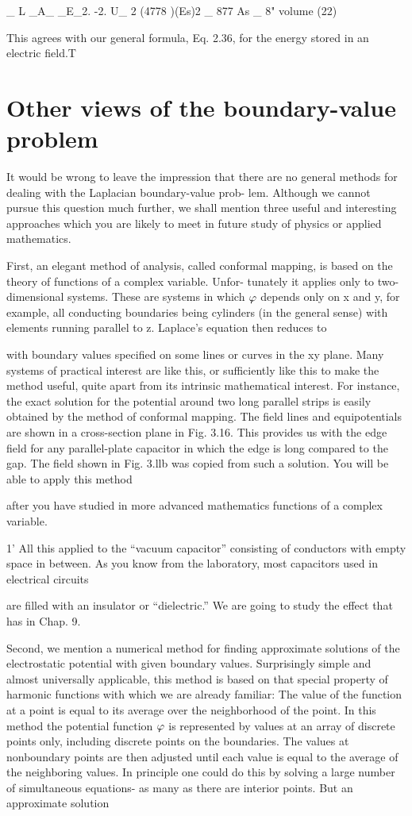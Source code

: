 _ L _A_ _E_2. -2.
U_ 2 (4778 )(Es)2 _ 877 As _ 8" volume (22)

This agrees with our general formula, Eq. 2.36, for the energy stored
in an electric field.T

\section{Other views of the boundary-value problem}

It would be wrong to leave the impression that there are no general
methods for dealing with the Laplacian boundary-value prob-
lem. Although we cannot pursue this question much further, we
shall mention three useful and interesting approaches which you are
likely to meet in future study of physics or applied mathematics.

First, an elegant method of analysis, called conformal mapping,
is based on the theory of functions of a complex variable. Unfor-
tunately it applies only to two-dimensional systems. These are systems
in which $\varphi$ depends only on x and y, for example, all conducting
boundaries being cylinders (in the general sense) with elements
running parallel to z. Laplace's equation then reduces to

with boundary values specified on some lines or curves in the xy
plane. Many systems of practical interest are like this, or sufficiently
like this to make the method useful, quite apart from its intrinsic
mathematical interest. For instance, the exact solution for the potential
around two long parallel strips is easily obtained by the
method of conformal mapping. The field lines and equipotentials
are shown in a cross-section plane in Fig. 3.16. This provides us
with the edge field for any parallel-plate capacitor in which the edge
is long compared to the gap. The field shown in Fig. 3.llb was
copied from such a solution. You will be able to apply this method

after you have studied in more advanced mathematics functions of
a complex variable.

1' All this applied to the ``vacuum capacitor'' consisting of conductors with empty space
in between. As you know from the laboratory, most capacitors used in electrical circuits

are filled with an insulator or ``dielectric.'' We are going to study the effect that has in
Chap. 9.

Second, we mention a numerical method for finding approximate
solutions of the electrostatic potential with given boundary values.
Surprisingly simple and almost universally applicable, this method
is based on that special property of harmonic functions with which
we are already familiar: The value of the function at a point is equal
to its average over the neighborhood of the point. In this method
the potential function $\varphi$ is represented by values at an array of discrete
points only, including discrete points on the boundaries. The
values at nonboundary points are then adjusted until each value is
equal to the average of the neighboring values. In principle one
could do this by solving a large number of simultaneous equations-
as many as there are interior points. But an approximate solution

